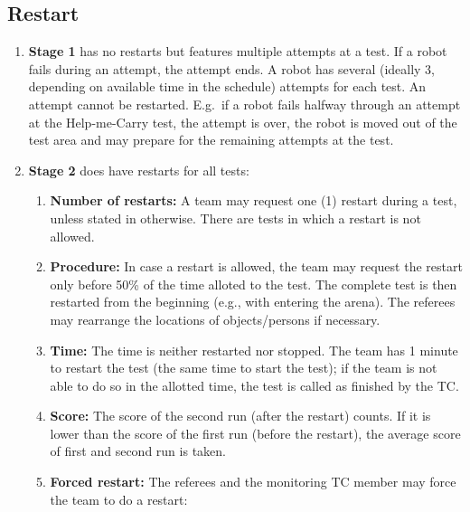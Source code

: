 \subsection{Restart}
\label{rule:restart}
\begin{enumerate}
	\item \textbf{Stage 1} has no restarts but features multiple attempts at a test.
	If a robot fails during an attempt, the attempt ends.
	A robot has several (ideally 3, depending on available time in the schedule) attempts for each test. An attempt cannot be restarted.
	E.g.~if a robot fails halfway through an attempt at the Help-me-Carry test, the attempt is over, the robot is moved out of the test area and may prepare for the remaining attempts at the test.

	\item \textbf{Stage 2} does have restarts for all tests:
	\begin{enumerate}
		\item \textbf{Number of restarts:} A team may request one (1) restart during a test, unless stated in otherwise. There are tests in which a restart is not allowed.
		\item \textbf{Procedure:} In case a restart is allowed, the team may request the restart only before 50\% of the time alloted to the test. The complete test is then restarted from the beginning (e.g., with entering the arena). The referees may rearrange the locations of objects/persons if necessary.
		\item \textbf{Time:} The time is neither restarted nor stopped. The team has 1 minute to restart the test (the same time to start the test); if the team is not able to do so in the allotted time, the test is called as finished by the TC.
		\item \textbf{Score:} The score of the second run (after the restart) counts. If it is lower than the score of the first run (before the restart), the average score of first and second run is taken.
		\item \textbf{Forced restart:} The referees and the monitoring TC member may force the team to do a restart:
	\end{enumerate}
\end{enumerate}

